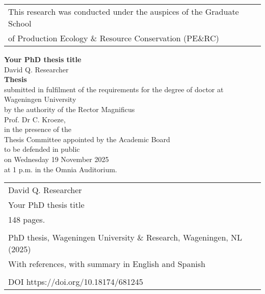 \begin{tabular}{l}
    \small{This research was conducted under the auspices of the Graduate School} \\  
    \small{of Production Ecology \& Resource Conservation (PE$\&$RC)}                         \\  
\end{tabular}

\newpage
\thispagestyle{empty}
\begin{center}
\Huge{\textbf{Your PhD thesis title}} \\
\vspace*{1cm}
\Large{David Q. Researcher}\\
\normalsize
\vspace*{\fill}
\textbf{Thesis} \\
submitted in fulfilment of the requirements for the degree of doctor at \\
Wageningen University\\
by the authority of the Rector Magnificus\\
Prof. Dr C. Kroeze,\\
in the presence of the\\
Thesis Committee appointed by the Academic Board\\
to be defended in public\\
on Wednesday 19 November 2025\\
at 1 p.m. in the Omnia Auditorium.\\
\end{center}

\newpage
\thispagestyle{empty}
\vspace*{\fill}
\begin{flushleft}
\begin{tabular}{l}
    David Q. Researcher                                                 \\  
    Your PhD thesis title                                     \\  
    148 pages.                                               \\  
                                                             \\  
    PhD thesis, Wageningen University \& Research, Wageningen, NL (2025) \\  
    With references, with summary in English and Spanish     \\  
                                                             \\  
    DOI https://doi.org/10.18174/681245                                             \\  
\end{tabular}
\end{flushleft}
